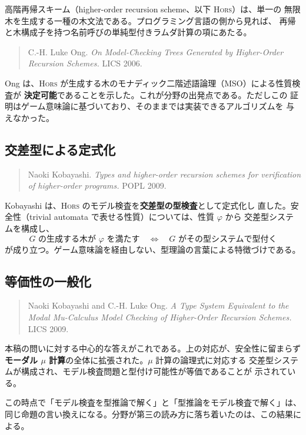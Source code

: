 \documentclass[11pt,a4paper]{ltjsarticle}
\newcommand{\HORS}{\textsc{Hors}}
\begin{document}
高階再帰スキーム（higher-order recursion scheme、以下 \HORS）は、単一の
無限木を生成する一種の木文法である。プログラミング言語の側から見れば、
再帰と木構成子を持つ名前呼びの単純型付きラムダ計算の項にあたる。

\begin{quote}
C.-H. Luke Ong.
\emph{On Model-Checking Trees Generated by Higher-Order Recursion Schemes.}
LICS 2006.
\end{quote}

Ong は、\HORS{} が生成する木のモナディック二階述語論理（MSO）による性質検査が
\textbf{決定可能}であることを示した。これが分野の出発点である。ただしこの
証明はゲーム意味論に基づいており、そのままでは実装できるアルゴリズムを
与えなかった。

\subsection{交差型による定式化}

\begin{quote}
Naoki Kobayashi.
\emph{Types and higher-order recursion schemes for verification of
higher-order programs.}
POPL 2009.
\end{quote}

Kobayashi は、\HORS{} のモデル検査を\textbf{交差型の型検査}として定式化し
直した。安全性（trivial automata で表せる性質）については、性質 $\varphi$ から
交差型システムを構成し、
\[
  \text{$G$ の生成する木が $\varphi$ を満たす}
  \quad\Longleftrightarrow\quad
  \text{$G$ がその型システムで型付く}
\]
が成り立つ。ゲーム意味論を経由しない、型理論の言葉による特徴づけである。

\subsection{等価性の一般化}

\begin{quote}
Naoki Kobayashi and C.-H. Luke Ong.
\emph{A Type System Equivalent to the Modal Mu-Calculus Model Checking of
Higher-Order Recursion Schemes.}
LICS 2009.
\end{quote}

本稿の問いに対する中心的な答えがこれである。上の対応が、安全性に留まらず
\textbf{モーダル $\mu$ 計算}の全体に拡張された。$\mu$ 計算の論理式に対応する
交差型システムが構成され、モデル検査問題と型付け可能性が等価であることが
示されている。

この時点で「モデル検査を型推論で解く」と「型推論をモデル検査で解く」は、
同じ命題の言い換えになる。分野が第三の読み方に落ち着いたのは、この結果に
よる。
\end{document}
